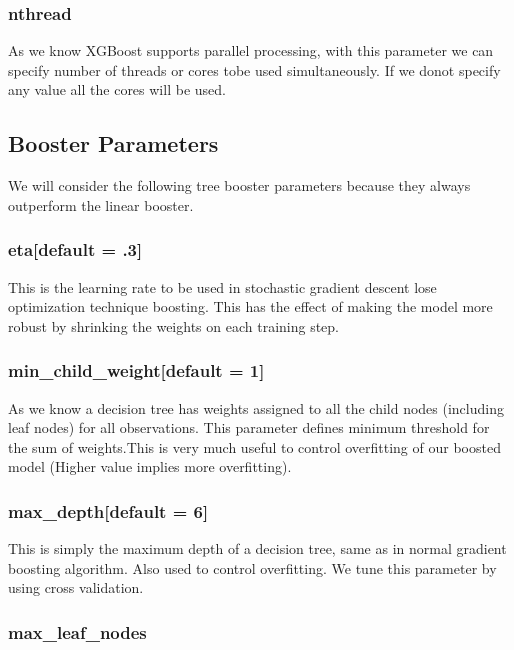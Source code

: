 \subsubsection{nthread} 

As we know XGBoost supports parallel processing, with this parameter we can specify
number of threads or cores tobe used simultaneously. If we donot specify any value 
all the cores will be used.

\subsection{Booster Parameters} 

We will consider the following tree booster parameters because they always outperform 
the linear booster.

\subsubsection{eta[default = .3]} 

This is the learning rate to be used in stochastic gradient descent lose optimization 
technique boosting. This has the effect of making the model more robust by shrinking the 
weights on each training step.

\subsubsection{min\_child\_weight[default = 1]} 

As we know a decision tree has weights assigned to all the child nodes (including leaf
nodes) for all observations. This parameter defines minimum threshold for the sum of 
weights.This is very much useful to control overfitting of our boosted model  (Higher 
value implies more overfitting).

\subsubsection{max\_depth[default = 6]} 

This is simply the maximum depth of a decision tree, same as in normal gradient boosting 
algorithm. Also used to control overfitting. We tune this parameter by using cross validation.

\subsubsection{max\_leaf\_nodes}

